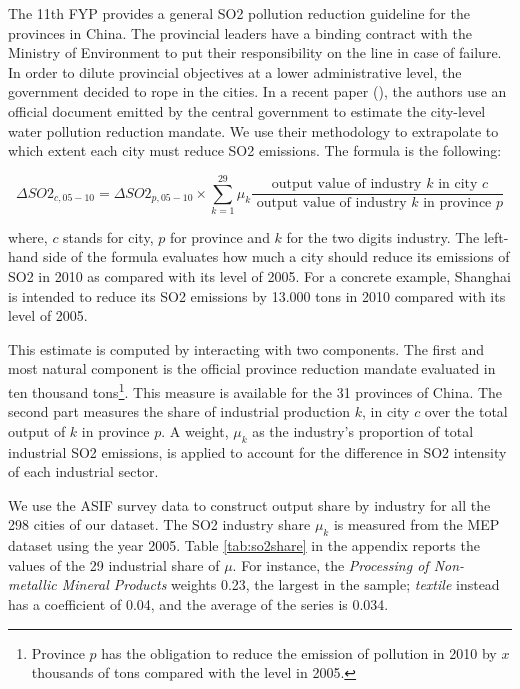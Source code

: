 \documentclass[12pt]{article}
\begin{document}
The 11th FYP provides a general SO2 pollution reduction guideline for the provinces in China. The provincial leaders have a binding contract with the Ministry of Environment to put their responsibility on the line in case of failure. In order to dilute provincial objectives at a lower administrative level, the government decided to rope in the cities. In a recent paper (\cite{Chen2018-ki}), the authors use an official document emitted by the central government to estimate the city-level water pollution reduction mandate. We use their methodology to extrapolate to which extent each city must reduce SO2 emissions. The formula is the following:

\begin{equation}
\Delta SO2_{c, 05 - 10}=\Delta SO2_{p, 05 - 10} \times \sum_{k=1}^{29} \mu_{k} \frac{\text { output value of industry } k \text { in city } c}{\text { output value of industry } k \text { in province } p}
\end{equation}

where, $c$ stands for city, $p$ for province and $k$ for the two digits industry. The left-hand side of the formula evaluates how much a city should reduce its emissions of SO2 in 2010 as compared with its level of 2005. For a concrete example, Shanghai is intended to reduce its SO2 emissions by 13.000 tons in 2010 compared with its level of 2005.

This estimate is computed by interacting with two components. The first and most natural component is the official province reduction mandate evaluated in ten thousand tons\footnote{Province $p$ has the obligation to reduce the emission of pollution in 2010 by $x$ thousands of tons compared with the level in 2005.}. This measure is available for the 31 provinces of China. The second part measures the share of industrial production $k$, in city $c$ over the total output of $k$ in province $p$. A weight, $\mu_k$ as the industry's proportion of total industrial SO2 emissions, is applied to account for the difference in SO2 intensity of each industrial sector.

We use the ASIF survey data to construct output share by industry for all the 298 cities of our dataset. The SO2 industry share $\mu_k$ is measured from the MEP dataset using the year 2005. Table \ref{tab:so2share} in the appendix reports the values of the 29 industrial share of $\mu$. For instance, the \textit{Processing of Non-metallic Mineral Products} weights 0.23, the largest in the sample; \textit{textile} instead has a coefficient of  0.04, and the average of the series is 0.034.
\end{document}
